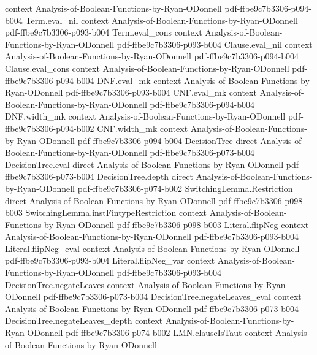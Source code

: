 \begin{lemma}
  {context}
  {Analysis-of-Boolean-Functions-by-Ryan-ODonnell}
  {pdf-ffbe9c7b3306-p094-b004}
\proofstep
  {Term.eval_nil}
  {context}
  {Analysis-of-Boolean-Functions-by-Ryan-ODonnell}
  {pdf-ffbe9c7b3306-p093-b004}
\proofstep
  {Term.eval_cons}
  {context}
  {Analysis-of-Boolean-Functions-by-Ryan-ODonnell}
  {pdf-ffbe9c7b3306-p093-b004}
\proofstep
  {Clause.eval_nil}
  {context}
  {Analysis-of-Boolean-Functions-by-Ryan-ODonnell}
  {pdf-ffbe9c7b3306-p094-b004}
\proofstep
  {Clause.eval_cons}
  {context}
  {Analysis-of-Boolean-Functions-by-Ryan-ODonnell}
  {pdf-ffbe9c7b3306-p094-b004}
\proofstep
  {DNF.eval_mk}
  {context}
  {Analysis-of-Boolean-Functions-by-Ryan-ODonnell}
  {pdf-ffbe9c7b3306-p093-b004}
\proofstep
  {CNF.eval_mk}
  {context}
  {Analysis-of-Boolean-Functions-by-Ryan-ODonnell}
  {pdf-ffbe9c7b3306-p094-b004}
\proofstep
  {DNF.width_mk}
  {context}
  {Analysis-of-Boolean-Functions-by-Ryan-ODonnell}
  {pdf-ffbe9c7b3306-p094-b002}
\proofstep
  {CNF.width_mk}
  {context}
  {Analysis-of-Boolean-Functions-by-Ryan-ODonnell}
  {pdf-ffbe9c7b3306-p094-b004}
\proofstep
  {DecisionTree}
  {direct}
  {Analysis-of-Boolean-Functions-by-Ryan-ODonnell}
  {pdf-ffbe9c7b3306-p073-b004}
\proofstep
  {DecisionTree.eval}
  {direct}
  {Analysis-of-Boolean-Functions-by-Ryan-ODonnell}
  {pdf-ffbe9c7b3306-p073-b004}
\proofstep
  {DecisionTree.depth}
  {direct}
  {Analysis-of-Boolean-Functions-by-Ryan-ODonnell}
  {pdf-ffbe9c7b3306-p074-b002}
\proofstep
  {SwitchingLemma.Restriction}
  {direct}
  {Analysis-of-Boolean-Functions-by-Ryan-ODonnell}
  {pdf-ffbe9c7b3306-p098-b003}
\proofstep
  {SwitchingLemma.instFintypeRestriction}
  {context}
  {Analysis-of-Boolean-Functions-by-Ryan-ODonnell}
  {pdf-ffbe9c7b3306-p098-b003}
\proofstep
  {Literal.flipNeg}
  {context}
  {Analysis-of-Boolean-Functions-by-Ryan-ODonnell}
  {pdf-ffbe9c7b3306-p093-b004}
\proofstep
  {Literal.flipNeg_eval}
  {context}
  {Analysis-of-Boolean-Functions-by-Ryan-ODonnell}
  {pdf-ffbe9c7b3306-p093-b004}
\proofstep
  {Literal.flipNeg_var}
  {context}
  {Analysis-of-Boolean-Functions-by-Ryan-ODonnell}
  {pdf-ffbe9c7b3306-p093-b004}
\proofstep
  {DecisionTree.negateLeaves}
  {context}
  {Analysis-of-Boolean-Functions-by-Ryan-ODonnell}
  {pdf-ffbe9c7b3306-p073-b004}
\proofstep
  {DecisionTree.negateLeaves_eval}
  {context}
  {Analysis-of-Boolean-Functions-by-Ryan-ODonnell}
  {pdf-ffbe9c7b3306-p073-b004}
\proofstep
  {DecisionTree.negateLeaves_depth}
  {context}
  {Analysis-of-Boolean-Functions-by-Ryan-ODonnell}
  {pdf-ffbe9c7b3306-p074-b002}
\proofstep
  {LMN.clauseIsTaut}
  {context}
  {Analysis-of-Boolean-Functions-by-Ryan-ODonnell}

\end{lemma}
